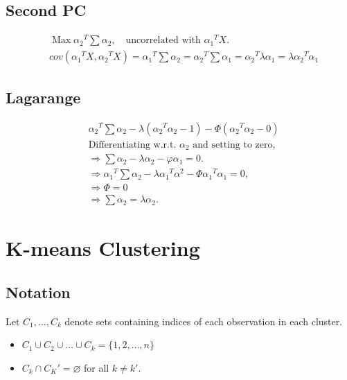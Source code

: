 \documentclass[a4paper,9pt,fleqn]{extarticle}
\DeclareMathOperator{\Max}{Max}
\begin{document}
\begin{minipage}[t]{0.45\textwidth}
    \subsection*{Second PC}
    \begin{align*}
        &\Max {\alpha_2}^T \sum \alpha_2, \quad \text{uncorrelated with } {\alpha_1}^T X.\\
        & cov({\alpha_1}^T X, {\alpha_2}^T X) = {\alpha_1}^T \sum \alpha_2
                                              = {\alpha_2}^T \sum \alpha_1
                                              = {\alpha_2}^T \lambda \alpha_1
                                              = \lambda {\alpha_2}^T \alpha_1
    \end{align*}
    \subsection*{Lagarange}
    \begin{align*}
        &{\alpha_2}^T \sum \alpha_2 - \lambda ({\alpha_2}^T \alpha_2 - 1) - \varPhi({\alpha_2}^T \alpha_2 - 0) \\
        &\text{Differentiating w.r.t. } \alpha_2 \text{ and setting to zero}, \\
        & \Rightarrow \sum \alpha_2 - \lambda \alpha_2 - \varphi \alpha_1 = 0. \\
        & \Rightarrow {\alpha_1}^T \sum \alpha_2 - \lambda {\alpha_1}^T \alpha^2 - \varPhi {\alpha_1}^T \alpha_1 = 0, \\
        & \Rightarrow \varPhi = 0 \\
        & \Rightarrow \sum \alpha_2 = \lambda \alpha_2.
    \end{align*}
\end{minipage}

\section{K-means Clustering}
\subsection*{Notation}
Let \(C_1, \dots, C_k\) denote sets containing indices of each observation in each cluster.
\begin{itemize}
    \item \(C_1 \cup C_2 \cup \dots \cup C_k = \{1,2,\dots,n\}\)
    \item \(C_k \cap {C_K}' = \varnothing \) for all \(k \neq k'\).
\end{itemize}
\end{document}
